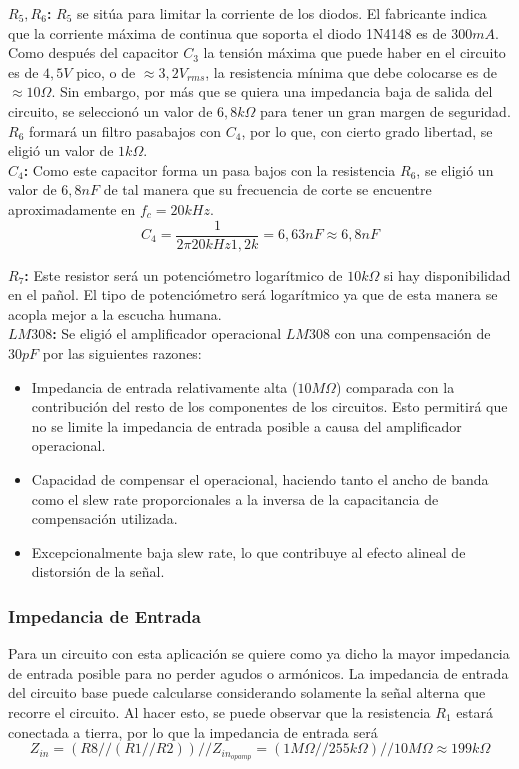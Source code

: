 \textbf{$R_5, R_6$:} $R_5$ se sitúa para limitar la corriente de los diodos. El fabricante indica que la corriente máxima de continua que soporta el diodo 1N4148 es de $300mA$. Como después del capacitor $C_3$ la tensión máxima que puede haber en el circuito es de $4,5V$ pico, o de $\approx 3,2V_{rms}$, la resistencia mínima que debe colocarse es de $\approx 10\Omega$. Sin embargo, por más que se quiera una impedancia baja de salida del circuito, se seleccionó un valor de $6,8k\Omega$ para tener un gran margen de seguridad. $R_6$ formará un filtro pasabajos con $C_4$, por lo que, con cierto grado libertad, se eligió un valor de $1k\Omega$.\\

\textbf{$C_4$:} Como este capacitor forma un pasa bajos con la resistencia $R_6$, se eligió un valor de $6,8nF$ de tal manera que su frecuencia de corte se encuentre aproximadamente en $f_c = 20kHz$.
\[ C_4 = \frac{1}{2\pi 20kHz 1,2k} = 6,63nF \approx 6,8nF\]

\textbf{$R_7$:} Este resistor será un potenciómetro logarítmico de $10k\Omega$ si hay disponibilidad en el pañol. El tipo de potenciómetro será logarítmico ya que de esta manera se acopla mejor a la escucha humana.\\

\textbf{$LM308$:} Se eligió el amplificador operacional $LM308$ con una compensación de $30pF$ por las siguientes razones:

\begin{itemize}
\item Impedancia de entrada relativamente alta ($10M\Omega$) comparada con la contribución del resto de los componentes de los circuitos. Esto permitirá que no se limite la impedancia de entrada posible a causa del amplificador operacional.
\item Capacidad de compensar el operacional, haciendo tanto el ancho de banda como el slew rate proporcionales a la inversa de la capacitancia de compensación utilizada.
\item Excepcionalmente baja slew rate, lo que contribuye al efecto alineal de distorsión de la señal.
\end{itemize}

\subsubsection{Impedancia de Entrada}

Para un circuito con esta aplicación se quiere como ya dicho la mayor impedancia de entrada posible para no perder agudos o armónicos.
La impedancia de entrada del circuito base puede calcularse considerando solamente la señal alterna que recorre el circuito. Al hacer esto, se puede observar que la resistencia $R_1$ estará conectada a tierra, por lo que la impedancia de entrada será
\[Z_{in} = (R8//(R1//R2))//Z_{in_{opamp}} = (1M\Omega // 255k\Omega)//10M\Omega \approx 199k\Omega\]

